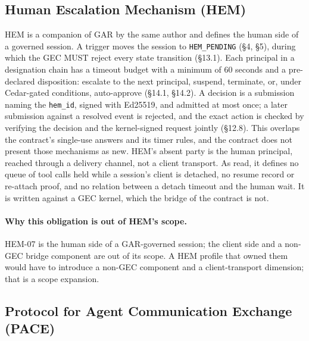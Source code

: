 \subsection{Human Escalation Mechanism (HEM)}\label{sec:rw-hem}

HEM \cite{I-D.sato-soos-hem} is a companion of GAR by the same author and
defines the human side of a governed session. A trigger moves the session
to \texttt{HEM\_PENDING} (\S 4, \S 5), during which the GEC MUST reject
every state transition (\S 13.1). Each principal in a designation chain has
a timeout budget with a minimum of 60 seconds and a pre-declared
disposition: escalate to the next principal, suspend, terminate, or, under
Cedar-gated conditions, auto-approve (\S 14.1, \S 14.2). A decision is a
submission naming the \texttt{hem\_id}, signed with Ed25519, and admitted
at most once; a later submission against a resolved event is rejected, and
the exact action is checked by verifying the decision and the
kernel-signed request jointly (\S 12.8). This overlaps the contract's
single-use answers and its timer rules, and the contract does not present
those mechanisms as new. HEM's absent party is the human principal, reached
through a delivery channel, not a client transport. As read, it defines no
queue of tool calls held while a session's client is detached, no resume
record or re-attach proof, and no relation between a detach timeout and
the human wait. It is written against a GEC kernel, which the bridge of
the contract is not.

\paragraph{Why this obligation is out of HEM's scope.}
HEM-07 is the human side of a GAR-governed session; the client side
and a non-GEC bridge component are out of its scope. A HEM profile
that owned them would have to introduce a non-GEC component and a
client-transport dimension; that is a scope expansion.

\subsection{Protocol for Agent Communication Exchange (PACE)}\label{sec:rw-pace}

